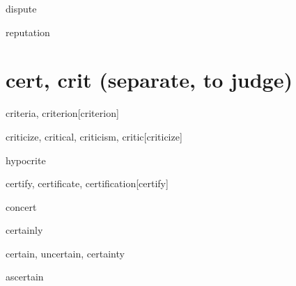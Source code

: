 \begin{DefWord}{dispute}
\end{DefWord}

\begin{DefWord}{reputation}
\end{DefWord}



\section{cert, crit (separate, to judge)}

\begin{DefWord}{criteria, criterion}[criterion]
\end{DefWord}

\begin{DefWord}{criticize, critical, criticism, critic}[criticize]
\end{DefWord}

\begin{DefWord}{hypocrite}
\end{DefWord}

\begin{DefWord}{certify, certificate, certification}[certify]
\end{DefWord}

\begin{DefWord}{concert}
\end{DefWord}

\begin{DefWord}{certainly}
\end{DefWord}

\begin{DefWord}{certain, uncertain, certainty}
\end{DefWord}

\begin{DefWord}{ascertain}
\end{DefWord}